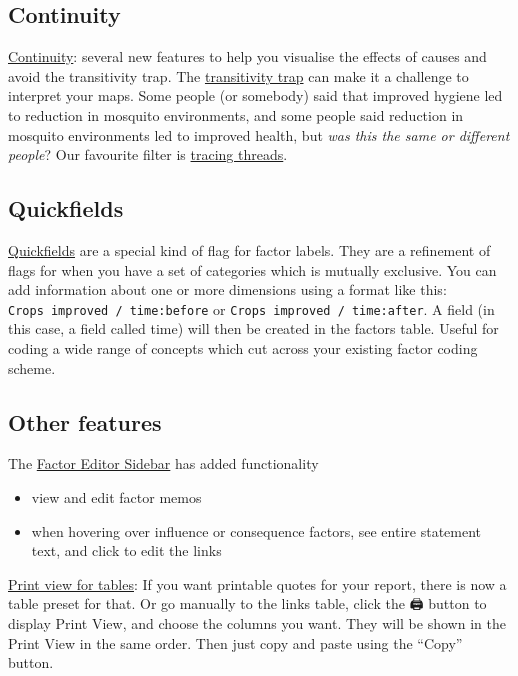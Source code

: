 \documentclass[
]{book}
\providecommand{\tightlist}{%
  \setlength{\itemsep}{0pt}\setlength{\parskip}{0pt}}
\begin{document}
\hypertarget{continuity}{%
\subsection{Continuity}\label{continuity}}

\protect\hyperlink{xcontinuity}{Continuity}: several new features to help you visualise the effects of causes and avoid the transitivity trap. The \protect\hyperlink{xtransitivity-trap}{transitivity trap} can make it a challenge to interpret your maps. Some people (or somebody) said that improved hygiene led to reduction in mosquito environments, and some people said reduction in mosquito environments led to improved health, but \emph{was this the same or different people}? Our favourite filter is \protect\hyperlink{xtracing-threads}{tracing threads}.

\hypertarget{quickfields-1}{%
\subsection{Quickfields}\label{quickfields-1}}

\protect\hyperlink{xquickfields}{Quickfields} are a special kind of flag for factor labels. They are a refinement of flags for when you have a set of categories which is mutually exclusive. You can add information about one or more dimensions using a format like this: \texttt{Crops\ improved\ /\ time:before} or \texttt{Crops\ improved\ /\ time:after}. A field (in this case, a field called time) will then be created in the factors table. Useful for coding a wide range of concepts which cut across your existing factor coding scheme.

\hypertarget{other-features}{%
\subsection{Other features}\label{other-features}}

The \href{xfactor-editor-sidebar}{Factor Editor Sidebar} has added functionality

\begin{itemize}
\tightlist
\item
  view and edit factor memos
\item
  when hovering over influence or consequence factors, see entire statement text, and click to edit the links
\end{itemize}

\href{xprint-view-tables}{Print view for tables}: If you want printable quotes for your report, there is now a table preset for that. Or go manually to the links table, click the 🖨️ button to display Print View, and choose the columns you want. They will be shown in the Print View in the same order. Then just copy and paste using the ``Copy'' button.
\end{document}
